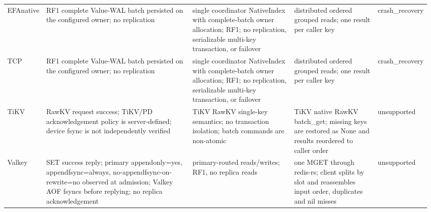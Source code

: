\begin{landscape}
\begin{longtable}{p{2cm}p{5cm}p{4.4cm}p{5cm}p{2cm}}
EFAnative & RF1 complete Value-WAL batch persisted on the configured owner; no replication & single coordinator NativeIndex with complete-batch owner allocation; RF1; no replication, serializable multi-key transaction, or failover & distributed ordered grouped reads; one result per caller key & crash\_\allowbreak{}recovery\\
TCP & RF1 complete Value-WAL batch persisted on the configured owner; no replication & single coordinator NativeIndex with complete-batch owner allocation; RF1; no replication, serializable multi-key transaction, or failover & distributed ordered grouped reads; one result per caller key & crash\_\allowbreak{}recovery\\
TiKV & RawKV request success; TiKV/PD acknowledgement policy is server-defined; device fsync is not independently verified & TiKV RawKV single-key semantics; no transaction isolation; batch commands are non-atomic & TiKV native RawKV batch\_\allowbreak{}get; missing keys are restored as None and results reordered to caller order & unsupported\\
Valkey & SET success reply; primary appendonly=yes, appendfsync=always, no-appendfsync-on-rewrite=no observed at admission; Valkey AOF fsyncs before replying; no replica acknowledgement & primary-routed reads/writes; RF1, no replica reads & one MGET through redis-rs; client splits by slot and reassembles input order, duplicates and nil misses & unsupported\\
\end{longtable}
\normalsize
\end{landscape}


